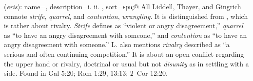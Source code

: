 \item[Quarrel,]

(\textit{eris}):
{
    name=,
    description={i.   ii. },
    sort=ερις@
}
All Liddell, Thayer, and Gingrich connote \emph{strife}, \emph{quarrel}, and \emph{contention}, \emph{wrangling}.
It is distinguished from ,
which is rather about rivalry. \emph{Strife} defines as ``violent or angry disagreement,'' \emph{quarrel} as ``to have an angry disagreement with someone,'' and \emph{contention} as ``to have an angry disagreement with someone.'' L. also mentions \emph{rivalry} described as ``a serious and often continuing competition.'' It is about an open conflict regarding the upper hand or rivalry, doctrinal or usual but not \emph{disunity} as in settling with a side.
Found in Gal 5:20; Rom 1:29, 13:13; 2~Cor 12:20.

